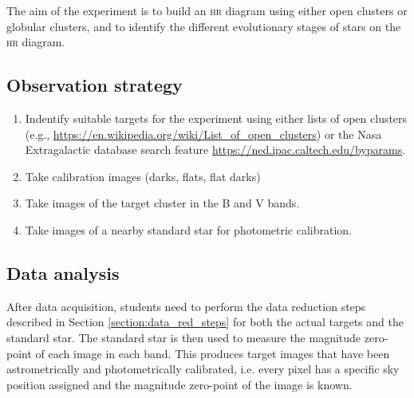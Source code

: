\documentclass[a4paper, 11pt, fleqn]{memoir}
\begin{document}
The aim of the experiment is to build an \textsc{hr} diagram using either open clusters or globular clusters, and to identify the different evolutionary stages of stars on the \textsc{hr} diagram.

\subsection{Observation strategy}
\begin{enumerate}
    \item Indentify suitable targets for the experiment using either lists of open clusters (e.g., \url{https://en.wikipedia.org/wiki/List_of_open_clusters}) or the Nasa Extragalactic database search feature \url{https://ned.ipac.caltech.edu/byparams}.
    \item Take calibration images (darks, flats, flat darks)
    \item Take images of the target cluster in the B and V bands.
    \item Take images of a nearby standard star for photometric calibration.
\end{enumerate}

\subsection{Data analysis}
\label{ssec:hr-data-analysis}

After data acquisition, students need to perform the data reduction steps described in Section \ref{section:data_red_steps} for both the actual targets and the standard star.
The standard star is then used to measure the magnitude zero-point of each image in each band.
This produces target images that have been astrometrically and photometrically calibrated, i.e. every pixel has a specific sky position assigned and the magnitude zero-point of the image is known.
\end{document}
